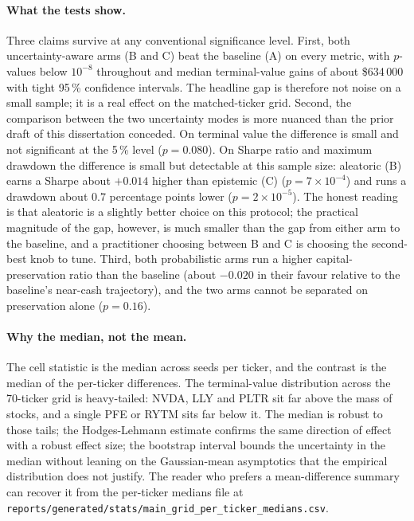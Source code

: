 \paragraph{What the tests show.} Three claims survive at any conventional significance level. First, both uncertainty-aware arms (B and C) beat the baseline (A) on every metric, with $p$-values below $10^{-8}$ throughout and median terminal-value gains of about \$634\,000 with tight 95\,\% confidence intervals. The headline gap is therefore not noise on a small sample; it is a real effect on the matched-ticker grid. Second, the comparison between the two uncertainty modes is more nuanced than the prior draft of this dissertation conceded. On terminal value the difference is small and not significant at the 5\,\% level ($p = 0.080$). On Sharpe ratio and maximum drawdown the difference is small but detectable at this sample size: aleatoric (B) earns a Sharpe about $+0.014$ higher than epistemic (C) ($p = 7 \times 10^{-4}$) and runs a drawdown about $0.7$ percentage points lower ($p = 2 \times 10^{-5}$). The honest reading is that aleatoric is a slightly better choice on this protocol; the practical magnitude of the gap, however, is much smaller than the gap from either arm to the baseline, and a practitioner choosing between B and C is choosing the second-best knob to tune. Third, both probabilistic arms run a higher capital-preservation ratio than the baseline (about $-0.020$ in their favour relative to the baseline's near-cash trajectory), and the two arms cannot be separated on preservation alone ($p = 0.16$).

\paragraph{Why the median, not the mean.} The cell statistic is the median across seeds per ticker, and the contrast is the median of the per-ticker differences. The terminal-value distribution across the 70-ticker grid is heavy-tailed: NVDA, LLY and PLTR sit far above the mass of stocks, and a single PFE or RYTM sits far below it. The median is robust to those tails; the Hodges-Lehmann estimate confirms the same direction of effect with a robust effect size; the bootstrap interval bounds the uncertainty in the median without leaning on the Gaussian-mean asymptotics that the empirical distribution does not justify. The reader who prefers a mean-difference summary can recover it from the per-ticker medians file at \texttt{reports/generated/stats/main\_grid\_per\_ticker\_medians.csv}.

